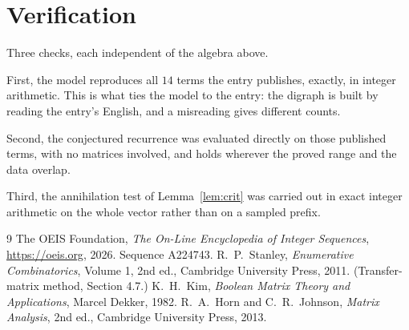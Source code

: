 \documentclass[11pt,a4paper]{article}
\theoremstyle{plain}
\theoremstyle{definition}
\begin{document}
\section{Verification}

Three checks, each independent of the algebra above.

First, the model reproduces all $14$ terms the entry publishes, exactly, in integer
arithmetic. This is what ties the model to the entry: the digraph is built by reading the
entry's English, and a misreading gives different counts.

Second, the conjectured recurrence was evaluated directly on those published terms, with no
matrices involved, and holds wherever the proved range and the data overlap.

Third, the annihilation test of Lemma~\ref{lem:crit} was carried out in exact integer
arithmetic on the whole vector rather than on a sampled prefix.

\begin{thebibliography}{9}
 The OEIS Foundation, \emph{The On-Line Encyclopedia of Integer
Sequences}, \url{https://oeis.org}, 2026. Sequence A224743.
 R.~P.~Stanley, \emph{Enumerative Combinatorics}, Volume 1, 2nd ed.,
Cambridge University Press, 2011. (Transfer-matrix method, Section 4.7.)
 K.~H.~Kim, \emph{Boolean Matrix Theory and Applications}, Marcel Dekker,
1982.
 R.~A.~Horn and C.~R.~Johnson, \emph{Matrix Analysis}, 2nd ed., Cambridge
University Press, 2013.
\end{thebibliography}
\end{document}
